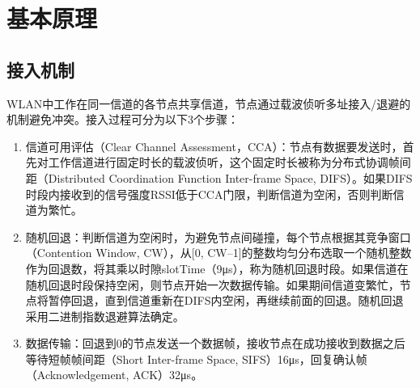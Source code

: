 \documentclass[bwprint]{gmcmthesis}
\begin{document}















\newpage
\section{基本原理}
\subsection{接入机制}
WLAN中工作在同一信道的各节点共享信道，节点通过载波侦听多址接入/退避的机制避免冲突。接入过程可分为以下3个步骤： 
\begin{enumerate}
    \item 信道可用评估（Clear Channel Assessment，CCA）：节点有数据要发送时，首先对工作信道进行固定时长的载波侦听，这个固定时长被称为分布式协调帧间距（Distributed Coordination Function Inter-frame Space, DIFS）。如果DIFS时段内接收到的信号强度RSSI低于CCA门限，判断信道为空闲，否则判断信道为繁忙。
    \item 随机回退：判断信道为空闲时，为避免节点间碰撞，每个节点根据其竞争窗口（Contention Window, CW），从[0, CW–1]的整数均匀分布选取一个随机整数作为回退数，将其乘以时隙slotTime（9μs），称为随机回退时段。如果信道在随机回退时段保持空闲，则节点开始一次数据传输。如果期间信道变繁忙，节点将暂停回退，直到信道重新在DIFS内空闲，再继续前面的回退。随机回退采用二进制指数退避算法确定。
    \item 数据传输：回退到0的节点发送一个数据帧，接收节点在成功接收到数据之后等待短帧帧间距（Short Inter-frame Space, SIFS）16μs，回复确认帧（Acknowledgement, ACK）32μs。
\end{enumerate}
\end{document}

